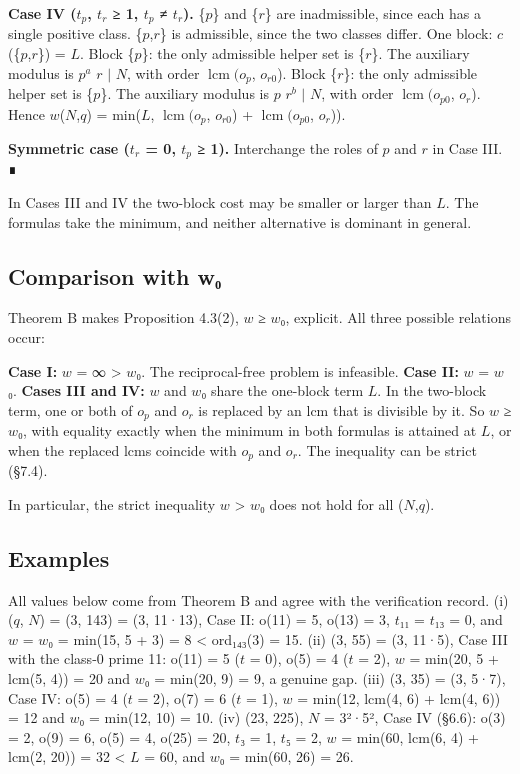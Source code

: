 \documentclass[pdflatex,sn-mathphys-num]{sn-jnl}
\theoremstyle{thmstyleone}
\theoremstyle{thmstylethree}
\begin{document}
\textbf{Case IV (\(t_p\), \(t_r\) ≥ 1, \(t_p\) ≠ \(t_r\)).} \{\(p\)\} and \{\(r\)\} are inadmissible, since each has a single positive class. \{\(p\),\(r\)\} is admissible, since the two classes differ. One block: \(c\)(\{\(p\),\(r\)\}) = \(L\). Block \{\(p\)\}: the only admissible helper set is \{\(r\)\}. The auxiliary modulus is \(p^a\) \(r\) \(\mid\) \(N\), with order \(\operatorname{lcm}(o_p\), \(o_{r0}\)). Block \{\(r\)\}: the only admissible helper set is \{\(p\)\}. The auxiliary modulus is \(p\) \(r^b\) \(\mid\) \(N\), with order \(\operatorname{lcm}(o_{p0}\), \(o_r\)). Hence \(w\)(\(N\),\(q\)) = min(\(L\), \(\operatorname{lcm}(o_p\), \(o_{r0}\)) + \(\operatorname{lcm}(o_{p0}\), \(o_r\))).

\textbf{Symmetric case (\(t_r\) = 0, \(t_p\) ≥ 1).} Interchange the roles of \(p\) and \(r\) in Case III. ∎

In Cases III and IV the two-block cost may be smaller or larger than \(L\). The formulas take the minimum, and neither alternative is dominant in general.

\subsection{Comparison with w₀}

Theorem B makes Proposition 4.3(2), \(w\) ≥ \(w\)₀, explicit. All three possible relations occur:

\textbf{Case I:} \(w\) = ∞ \textgreater{} \(w\)₀. The reciprocal-free problem is infeasible. \textbf{Case II:} \(w\) = \(w\)₀. \textbf{Cases III and IV:} \(w\) and \(w\)₀ share the one-block term \(L\). In the two-block term, one or both of \(o_p\) and \(o_r\) is replaced by an lcm that is divisible by it. So \(w\) ≥ \(w\)₀, with equality exactly when the minimum in both formulas is attained at \(L\), or when the replaced lcms coincide with \(o_p\) and \(o_r\). The inequality can be strict (§7.4).

In particular, the strict inequality \(w\) \textgreater{} \(w\)₀ does not hold for all (\(N\),\(q\)).

\subsection{Examples}

All values below come from Theorem B and agree with the verification record. (i) (\(q\), \(N\)) = (3, 143) = (3, 11·13), Case II: o(11) = 5, o(13) = 3, \(t\)₁₁ = \(t\)₁₃ = 0, and \(w\) = \(w\)₀ = min(15, 5 + 3) = 8 \textless{} ord₁₄₃(3) = 15. (ii) (3, 55) = (3, 11·5), Case III with the class-0 prime 11: o(11) = 5 (\(t\) = 0), o(5) = 4 (\(t\) = 2), \(w\) = min(20, 5 + lcm(5, 4)) = 20 and \(w\)₀ = min(20, 9) = 9, a genuine gap. (iii) (3, 35) = (3, 5·7), Case IV: o(5) = 4 (\(t\) = 2), o(7) = 6 (\(t\) = 1), \(w\) = min(12, lcm(4, 6) + lcm(4, 6)) = 12 and \(w\)₀ = min(12, 10) = 10. (iv) (23, 225), \(N\) = 3²·5², Case IV (§6.6): o(3) = 2, o(9) = 6, o(5) = 4, o(25) = 20, \(t\)₃ = 1, \(t\)₅ = 2, \(w\) = min(60, lcm(6, 4) + lcm(2, 20)) = 32 \textless{} \(L\) = 60, and \(w\)₀ = min(60, 26) = 26.
\end{document}
